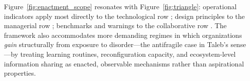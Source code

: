 Figure~\ref{fig:enactment_scope} resonates with Figure~\ref{fig:triangle}: operational indicators apply most directly to the technological row \autocite{bruneau2003framework,kuypers2018designing}; design principles to the managerial row \autocite{boin2013resilient,calder2021iso,bcbs2021operational,nist2024csf}; benchmarks and warnings to the collaborative row \autocite{enisa2017isacs,ecb2018tiber,european2022regulation}. The framework also accommodates more demanding regimes in which organizations \emph{gain} structurally from exposure to disorder---the antifragile case in Taleb's sense \autocite{taleb2012antifragile}---by treating learning routines, reconfiguration capacity, and ecosystem-level information sharing as enacted, observable mechanisms rather than aspirational properties.
